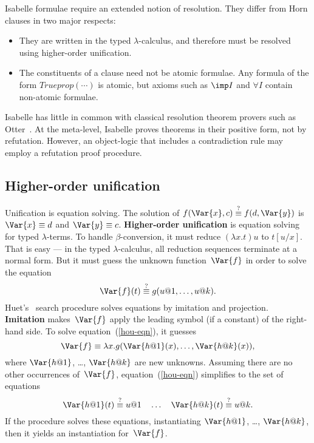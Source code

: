 Isabelle formulae require an extended notion of resolution.
They differ from Horn clauses in two major respects:
\begin{itemize}
  \item They are written in the typed $\lambda$-calculus, and therefore must be
resolved using higher-order unification.

\item The constituents of a clause need not be atomic formulae.  Any
  formula of the form $Trueprop(\cdots)$ is atomic, but axioms such as
  ${\imp}I$ and $\forall I$ contain non-atomic formulae.
\end{itemize}
Isabelle has little in common with classical resolution theorem provers
such as Otter~\cite{wos-bledsoe}.  At the meta-level, Isabelle proves
theorems in their positive form, not by refutation.  However, an
object-logic that includes a contradiction rule may employ a refutation
proof procedure.


\subsection{Higher-order unification}
Unification is equation solving.  The solution of $f(\Var{x},c) \qeq
f(d,\Var{y})$ is $\Var{x}\equiv d$ and $\Var{y}\equiv c$.  {\bf
Higher-order unification} is equation solving for typed $\lambda$-terms.
To handle $\beta$-conversion, it must reduce $(\lambda x.t)u$ to $t[u/x]$.
That is easy --- in the typed $\lambda$-calculus, all reduction sequences
terminate at a normal form.  But it must guess the unknown
function~$\Var{f}$ in order to solve the equation
\begin{equation} \label{hou-eqn}
 \Var{f}(t) \qeq g(u@1,\ldots,u@k).
\end{equation}
Huet's~\cite{huet75} search procedure solves equations by imitation and
projection.  {\bf Imitation} makes~$\Var{f}$ apply the leading symbol (if a
constant) of the right-hand side.  To solve equation~(\ref{hou-eqn}), it
guesses
\[ \Var{f} \equiv \lambda x. g(\Var{h@1}(x),\ldots,\Var{h@k}(x)), \]
where $\Var{h@1}$, \ldots, $\Var{h@k}$ are new unknowns.  Assuming there are no
other occurrences of~$\Var{f}$, equation~(\ref{hou-eqn}) simplifies to the
set of equations
\[ \Var{h@1}(t)\qeq u@1 \quad\ldots\quad \Var{h@k}(t)\qeq u@k. \]
If the procedure solves these equations, instantiating $\Var{h@1}$, \ldots,
$\Var{h@k}$, then it yields an instantiation for~$\Var{f}$.

